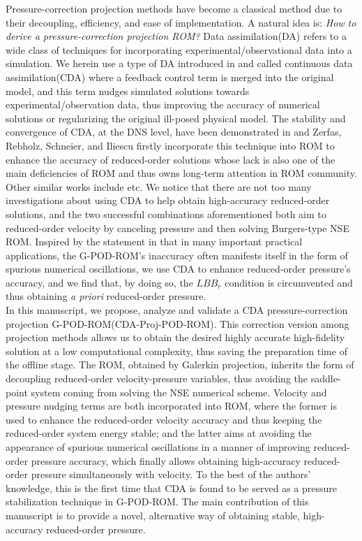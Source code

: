 \documentclass[10pt,twoside,openany,UTF8,CJK]{article}
\begin{document}
	\indent Pressure-correction projection methods have become a classical method due to their decoupling, efficiency, and ease of implementation. A natural idea is: \textit{How to derive a pressure-correction projection ROM?} Data assimilation(DA) refers to a wide class of techniques for incorporating experimental/observational data into a simulation. We herein use a type of DA introduced in \cite{CDA-2014-JNS} and called continuous data assimilation(CDA) where a feedback control term is merged into the original model, and this term nudges simulated solutions towards experimental/observation data, thus improving the accuracy of numerical solutions or regularizing the original ill-posed physical model. The stability and convergence of CDA, at the DNS level, have been demonstrated in \cite{CDA-FEM-2019-CMAME, CDA-SINUM-2020} and Zerfas, Rebholz, Schneier, and Iliescu\cite{CDA-2019-CMAME} firstly incorporate this technique into ROM to enhance the accuracy of reduced-order solutions whose lack is also one of the main deficiencies of ROM and thus owns long-term attention in ROM community. Other similar works include \cite{CDA-POD-2022-JCAM} etc. We notice that there are not too many investigations about using CDA to help obtain high-accuracy reduced-order solutions, and the two successful combinations aforementioned both aim to reduced-order velocity by canceling pressure and then solving Burgers-type NSE ROM. Inspired by the statement in \cite{ROM-Clusures-2022} that in many important practical applications, the G-POD-ROM’s inaccuracy often manifests itself in the form of spurious numerical oscillations, we use CDA to enhance reduced-order pressure’s accuracy, and we find that, by doing so, the $LBB_r$ condition is circumvented and thus obtaining \textit{a priori} reduced-order pressure.  \\
	\indent In this manuscript, we propose, analyze and validate a CDA pressure-correction projection G-POD-ROM(CDA-Proj-POD-ROM). This correction version among projection methods allows us to obtain the desired highly accurate high-fidelity solution at a low computational complexity, thus saving the preparation time of the offline stage. The ROM, obtained by Galerkin projection, inherits the form of decoupling reduced-order velocity-pressure variables, thus avoiding the saddle-point system coming from solving the NSE numerical scheme. Velocity and pressure nudging terms are both incorporated into ROM, where the former is used to enhance the reduced-order velocity accuracy and thus keeping the reduced-order system energy stable; and the latter aims at avoiding the appearance of spurious numerical oscillations in a manner of improving reduced-order pressure accuracy, which finally allows obtaining high-accuracy reduced-order pressure simultaneously with velocity. To the best of the authors' knowledge, this is the first time that CDA is found to be served as a pressure stabilization technique in G-POD-ROM. The main contribution of this manuscript is to provide a novel, alternative way of obtaining stable, high-accuracy reduced-order pressure.  \\
\end{document}
